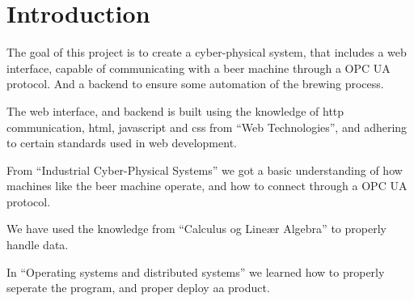 \section{Introduction}

The goal of this project is to create a cyber-physical system, that includes a web interface, capable of communicating with a beer machine
through a OPC UA protocol. And a backend to ensure some automation of the brewing process.\newline

The web interface, and backend is built using the knowledge of http communication, html, javascript and css from “Web Technologies”,
and adhering to certain standards used in web development. 

From “Industrial Cyber-Physical Systems” we got a basic understanding of how machines like the beer machine operate, 
and how to connect through a OPC UA protocol.

We have used the knowledge from “Calculus og Lineær Algebra” to properly handle data.

In “Operating systems and distributed systems” we learned how to properly seperate the program, and proper deploy aa product.